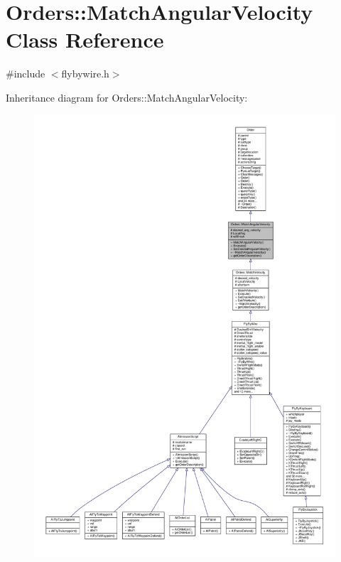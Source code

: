 \hypertarget{classOrders_1_1MatchAngularVelocity}{}\section{Orders\+:\+:Match\+Angular\+Velocity Class Reference}
\label{classOrders_1_1MatchAngularVelocity}


{\ttfamily \#include $<$flybywire.\+h$>$}



Inheritance diagram for Orders\+:\+:Match\+Angular\+Velocity\+:
\nopagebreak
\begin{figure}[H]
\begin{center}
\leavevmode
\includegraphics[width=350pt]{d4/dfe/classOrders_1_1MatchAngularVelocity__inherit__graph}
\end{center}
\end{figure}


